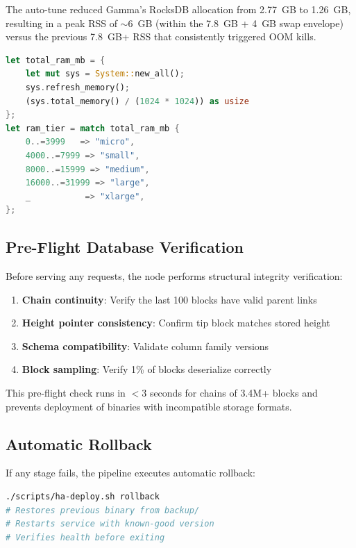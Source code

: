 \documentclass[11pt,a4paper,twocolumn]{article}
\begin{document}
The auto-tune reduced Gamma's RocksDB allocation from 2.77~GB to 1.26~GB, resulting
in a peak RSS of $\sim$6~GB (within the 7.8~GB + 4~GB swap envelope) versus the
previous 7.8~GB+ RSS that consistently triggered OOM kills.

\begin{lstlisting}[language=Rust,caption={RAM auto-detection in kv.rs}]
let total_ram_mb = {
    let mut sys = System::new_all();
    sys.refresh_memory();
    (sys.total_memory() / (1024 * 1024)) as usize
};
let ram_tier = match total_ram_mb {
    0..=3999   => "micro",
    4000..=7999 => "small",
    8000..=15999 => "medium",
    16000..=31999 => "large",
    _           => "xlarge",
};
\end{lstlisting}

\subsection{Pre-Flight Database Verification}

Before serving any requests, the node performs structural integrity verification:

\begin{enumerate}[nosep,leftmargin=*]
    \item \textbf{Chain continuity}: Verify the last 100 blocks have valid parent links
    \item \textbf{Height pointer consistency}: Confirm tip block matches stored height
    \item \textbf{Schema compatibility}: Validate column family versions
    \item \textbf{Block sampling}: Verify 1\% of blocks deserialize correctly
\end{enumerate}

This pre-flight check runs in $<$3 seconds for chains of 3.4M+ blocks and prevents
deployment of binaries with incompatible storage formats.

\subsection{Automatic Rollback}

If any stage fails, the pipeline executes automatic rollback:

\begin{lstlisting}[language=bash,caption={Emergency rollback procedure}]
./scripts/ha-deploy.sh rollback
# Restores previous binary from backup/
# Restarts service with known-good version
# Verifies health before exiting
\end{lstlisting}
\end{document}
